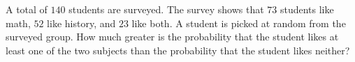 A total of $140$ students are surveyed. The survey shows that $73$ students like math, $52$ like history, and $23$ like both. A student is picked at random from the surveyed group. How much greater is the probability that the student likes at least one of the two subjects than the probability that the student likes neither?

